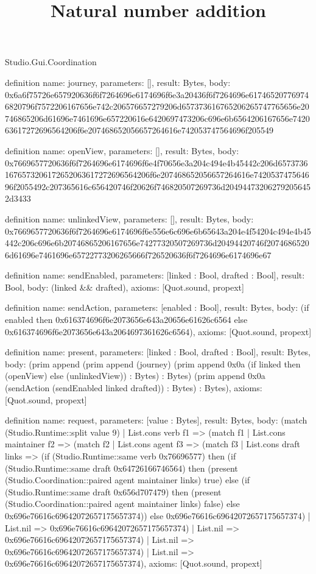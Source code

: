 \begin{lexlean}{Studio.Gui.Coordination}
\title{Natural number addition}
\begin{semanticmodule}
definition{
  name: journey,
  parameters: [],
  result: Bytes,
  body: 0x6a6f75726e657920636f6f7264696e6174696f6e3a20436f6f7264696e617465207769746820796f7572206167656e742c206576657279206d657373616765206265747765656e20746865206d61696e7461696e657220616e6420697473206c696e6b6564206167656e742063617272696564206f6e207468652056657264616e742053747564696f205549
}

definition{
  name: openView,
  parameters: [],
  result: Bytes,
  body: 0x7669657720636f6f7264696e6174696f6e4f70656e3a204c494e4b45442c206d65737361676573206172652063617272696564206f6e207468652056657264616e742053747564696f2055492c207365616c656420746f20626f746820507269736d204944732062792056452d3433
}

definition{
  name: unlinkedView,
  parameters: [],
  result: Bytes,
  body: 0x7669657720636f6f7264696e6174696f6e556e6c696e6b65643a204e4f54204c494e4b45442c206c696e6b20746865206167656e74277320507269736d20494420746f20746865206d61696e7461696e65722773206265666f726520636f6f7264696e6174696e67
}

definition{
  name: sendEnabled,
  parameters: [linked : Bool, drafted : Bool],
  result: Bool,
  body: (linked && drafted),
  axioms: [Quot.sound, propext]
}

definition{
  name: sendAction,
  parameters: [enabled : Bool],
  result: Bytes,
  body: (if enabled then 0x616374696f6e2073656e643a20656e61626c6564 else 0x616374696f6e2073656e643a2064697361626c6564),
  axioms: [Quot.sound, propext]
}

definition{
  name: present,
  parameters: [linked : Bool, drafted : Bool],
  result: Bytes,
  body: (prim append (prim append (journey) (prim append 0x0a (if linked then (openView) else (unlinkedView)) : Bytes) : Bytes) (prim append 0x0a (sendAction (sendEnabled linked drafted)) : Bytes) : Bytes),
  axioms: [Quot.sound, propext]
}

definition{
  name: request,
  parameters: [value : Bytes],
  result: Bytes,
  body: (match (Studio.Runtime::split value 9)
    | List.cons verb f1 => (match f1
      | List.cons maintainer f2 => (match f2
        | List.cons agent f3 => (match f3
          | List.cons draft links => (if (Studio.Runtime::same verb 0x76696577) then (if (Studio.Runtime::same draft 0x64726166746564) then (present (Studio.Coordination::paired agent maintainer links) true) else (if (Studio.Runtime::same draft 0x656d707479) then (present (Studio.Coordination::paired agent maintainer links) false) else 0x696e76616c69642072657175657374)) else 0x696e76616c69642072657175657374)
          | List.nil => 0x696e76616c69642072657175657374)
        | List.nil => 0x696e76616c69642072657175657374)
      | List.nil => 0x696e76616c69642072657175657374)
    | List.nil => 0x696e76616c69642072657175657374),
  axioms: [Quot.sound, propext]
}


\end{semanticmodule}
\end{lexlean}
